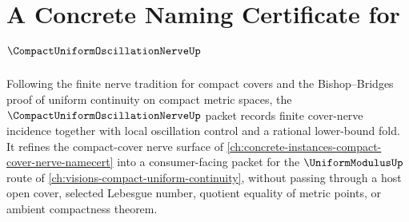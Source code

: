 \chapter{A Concrete Naming Certificate for $\CompactUniformOscillationNerveUp$}
\label{ch:concrete-instances-compact-uniform-oscillation-nerve-namecert}

Following the finite nerve tradition for compact covers and the Bishop--Bridges proof of uniform continuity on compact metric spaces, the $\CompactUniformOscillationNerveUp$ packet records finite cover-nerve incidence together with local oscillation control and a rational lower-bound fold. It refines the compact-cover nerve surface of \autoref{ch:concrete-instances-compact-cover-nerve-namecert} into a consumer-facing packet for the $\UniformModulusUp$ route of \autoref{ch:visions-compact-uniform-continuity}, without passing through a host open cover, selected Lebesgue number, quotient equality of metric points, or ambient compactness theorem.

